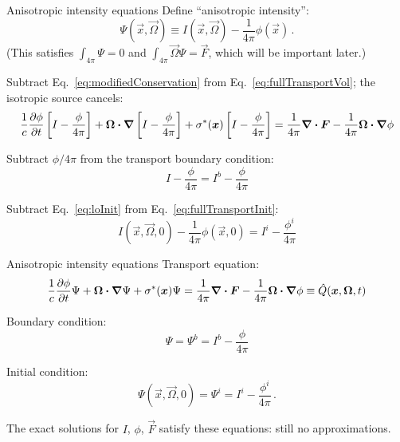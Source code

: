 \documentclass{beamer}
\begin{document}
\begin{frame}{Anisotropic intensity equations}
  Define ``anisotropic intensity'':
  \begin{equation} \label{eq:capPsi}
    \Psi(\vec{x}, \vec{\Omega}) \equiv I(\vec{x}, \vec{\Omega})
    - \frac{1}{4\pi} \phi(\vec{x})\,.
  \end{equation}
  (This satisfies $\int_{4\pi} \Psi=0$ and $\int_{4\pi} \vec{\Omega} \Psi =
  \vec{F}$, which
  will be important later.)

  Subtract Eq.~\eqref{eq:modifiedConservation} from
  Eq.~\eqref{eq:fullTransportVol}; the isotropic source cancels:
\begin{multline*}
  \frac{1}{c} \frac{\partial \phi}{\partial t} \left[ I - \frac{\phi}{4\pi} \right]
    + \bm{\Omega}\bm{\cdot} \bm{\nabla} \left[ I - \frac{\phi}{4\pi} \right]
    + \sigma^\ast(\bm{x})\left[ I - \frac{\phi}{4\pi} \right]
  = \frac{1}{4\pi} \bm{\nabla} \bm{\cdot}\bm{F} -
  \frac{1}{4\pi} \bm{\Omega}\bm{\cdot} \bm{\nabla} \phi
\end{multline*}

  Subtract $\phi/4\pi$ from the transport boundary condition:
  \begin{equation*}
    I - \frac{\phi}{4\pi} = I^b - \frac{\phi}{4\pi}
  \end{equation*}

  Subtract Eq.~\eqref{eq:loInit} from Eq.~\eqref{eq:fullTransportInit}:
  \begin{equation*}
    I(\vec{x}, \vec{\Omega}, 0) - \frac{1}{4\pi}\phi(\vec{x}, 0)
    = I^i - \frac{\phi^i}{4\pi}
  \end{equation*}
\end{frame}

\begin{frame}{Anisotropic intensity equations}
  Transport equation:
\begin{equation*}
  \frac{1}{c} \frac{\partial \phi}{\partial t} \Psi
   + \bm{\Omega}\bm{\cdot} \bm{\nabla} \Psi
   + \sigma^\ast(\bm{x}) \Psi
  = \frac{1}{4\pi} \bm{\nabla} \bm{\cdot}\bm{F} -
  \frac{1}{4\pi} \bm{\Omega}\bm{\cdot} \bm{\nabla} \phi
  \equiv \hat Q(\bm{x}, \bm{\Omega}, t)
\end{equation*}

  Boundary condition:
  \begin{equation*}
    \Psi = \Psi^b = I^b - \frac{\phi}{4\pi}
  \end{equation*}

  Initial condition:
  \begin{equation*}
    \Psi(\vec{x}, \vec{\Omega}, 0) = \Psi^i = I^i - \frac{\phi^i}{4\pi} \,.
  \end{equation*}

  The exact solutions for $I$, $\phi$, $\vec{F}$ satisfy these equations: still
  no approximations.
\end{frame}
\end{document}
